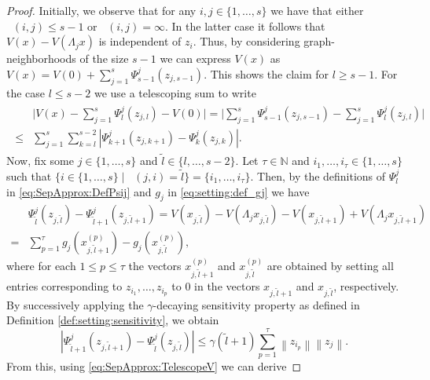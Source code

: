 \documentclass{article}
\def\N{\mathbb{N}}
\DeclareMathOperator{\distG}{\operatorname{dist_\mathcal{G}}} %
\newcommand{\agents}{\lbrace 1, \dots, s \rbrace}
\newcommand{\abs}[1]{\left\lvert {#1} \right\rvert}
\newcommand{\norm}[1]{\left\lVert {#1} \right\rVert}
\begin{document}
\begin{proof}
Initially, we observe that for any $i, j \in \agents$ we have that either $\distG(i,j) \leq s-1 $ or $\distG(i,j) = \infty$. In the latter case it follows that $V(x) - V(\Lambda_j x)$ is independent of $z_i$. Thus, by considering graph-neighborhoods of the size $s-1$ we can express $V(x)$ as 
$V(x) = V(0) + \sum_{j=1}^s \Psi_{s-1}^j(z_{j, s-1})$. This shows the claim for $l \ge s-1$. For the case $l \le s-2$ we use a telescoping sum to write  
\begin{align}       \begin{split}\label{eq:SepApprox:TelescopeV}
        & \Big| {V(x) - \sum_{j=1}^s \Psi_l^j(z_{j,l}) - V(0)}  \Big| =  \Big| {\sum_{j=1}^s \Psi_{s-1}^j(z_{j,s-1}) - \sum_{j=1}^s \Psi_l^j(z_{j,l})}  \Big| \\ \leq & \sum_{j=1}^s \sum_{k = l}^{s-2} \abs{\Psi_{k+1}^j(z_{j,k+1}) - \Psi_{k}^j(z_{j,k})}. 
    \end{split}
\end{align}
Now, fix some $j \in \agents$ and $\tilde{l} \in \{l, \dots, s-2\}$. Let $\tau \in \N$ and $i_1, \dots, i_\tau \in \agents$ such that $\lbrace i \in \agents \mid \distG(j,i) = \tilde l \rbrace = \lbrace i_1, \dots, i_\tau \rbrace $.
Then, by the definitions of $\Psi_l^j$ in \eqref{eq:SepApprox:DefPsij} and $g_j$ in \eqref{eq:setting:def_gj} we have
    \begin{align*}
        & \Psi_{\tilde l}^j(z_{j,{\tilde l}}) -\Psi_{{\tilde l}+1}^j(z_{j,{\tilde l}+1}) = V(x_{j,{\tilde l}}) - V(\Lambda_j x_{j,{\tilde l}}) - V(x_{j,{\tilde l}+1}) + V(\Lambda_j x_{j,{\tilde l}+1}) \\ 
        = &  \sum_{p = 1}^\tau g_j(x_{j, {\tilde l}+1}^{(p)}) - g_j(x_{j, {\tilde l}}^{(p)}), 
    \end{align*}
    where for each $1 \leq p \leq \tau$ the vectors $x_{j, {\tilde l}+1}^{(p)}$ and $x_{j, {\tilde l}}^{(p)}$ are obtained by setting all entries corresponding to $z_{i_1}, \dots, z_{i_p}$ to $0$ in the vectors $x_{j, {\tilde l}+1}$ and $x_{j,{\tilde l}}$, respectively. By successively applying the $\gamma$-decaying sensitivity property as defined in Definition \ref{def:setting:sensitivity}, we obtain
    \begin{equation*}
        \abs{ \Psi_{\tilde l+1}^j(z_{j,\tilde l+1}) -\Psi_{\tilde l}^j(z_{j,\tilde l})} \leq \gamma(\tilde l+1) \sum_{p=1}^\tau \norm{z_{i_p}} \norm{z_j}. 
    \end{equation*}
    From this, using \eqref{eq:SepApprox:TelescopeV} we can derive

\end{proof}
\end{document}

